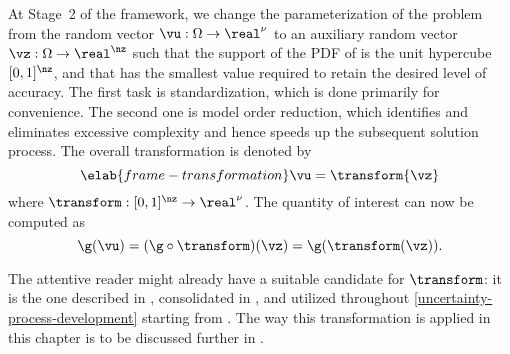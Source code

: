 At Stage~2 of the framework, we change the parameterization of the problem from
the random vector $\vu: \Omega \to \real^\nu$ to an auxiliary random vector
$\vz: \Omega \to \real^\nz$ such that the support of the \ac{PDF} of \vz is the
unit hypercube $[0, 1]^\nz$, and that \nz has the smallest value required to
retain the desired level of accuracy. The first task is standardization, which
is done primarily for convenience. The second one is model order reduction,
which identifies and eliminates excessive complexity and hence speeds up the
subsequent solution process. The overall transformation is denoted by
\begin{equation} \elab{frame-transformation}
  \vu = \transform{\vz}
\end{equation}
where $\transform: [0, 1]^\nz \to \real^\nu$. The quantity of interest \g can
now be computed as
\[
  \g(\vu) = (\g \circ \transform)(\vz) = \g(\transform(\vz)).
\]

The attentive reader might already have a suitable candidate for $\transform$:
it is the one described in , consolidated in
, and utilized throughout
\cref{uncertainty-process-development} starting from
. The way this transformation is applied in this
chapter is to be discussed further in .

